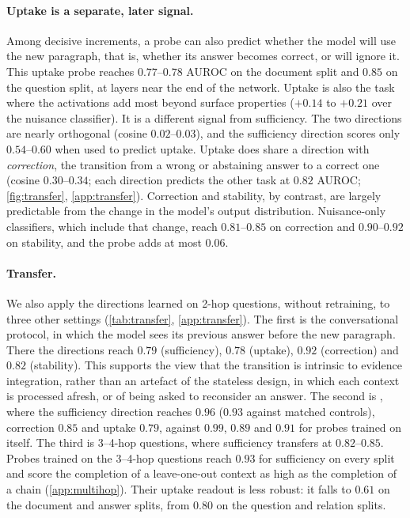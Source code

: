 \paragraph{Uptake is a separate, later signal.}
Among decisive increments, a probe can also predict whether the model will use the new paragraph, that is, whether its answer becomes correct, or will ignore it. This uptake probe reaches $0.77$--$0.78$ AUROC on the document split and $0.85$ on the question split, at layers near the end of the network. Uptake is also the task where the activations add most beyond surface properties ($+0.14$ to $+0.21$ over the nuisance classifier). It is a different signal from sufficiency. The two directions are nearly orthogonal (cosine $0.02$--$0.03$), and the sufficiency direction scores only $0.54$--$0.60$ when used to predict uptake. Uptake does share a direction with \emph{correction}, the transition from a wrong or abstaining answer to a correct one (cosine $0.30$--$0.34$; each direction predicts the other task at $0.82$ AUROC; \cref{fig:transfer}, \cref{app:transfer}). Correction and stability, by contrast, are largely predictable from the change in the model's output distribution. Nuisance-only classifiers, which include that change, reach $0.81$--$0.85$ on correction and $0.90$--$0.92$ on stability, and the probe adds at most $0.06$.

\paragraph{Transfer.}
We also apply the directions learned on 2-hop \musique{} questions, without retraining, to three other settings (\cref{tab:transfer}, \cref{app:transfer}). The first is the conversational protocol, in which the model sees its previous answer before the new paragraph. There the directions reach $0.79$ (sufficiency), $0.78$ (uptake), $0.92$ (correction) and $0.82$ (stability). This supports the view that the transition is intrinsic to evidence integration, rather than an artefact of the stateless design, in which each context is processed afresh, or of being asked to reconsider an answer. The second is \twowiki{}, where the sufficiency direction reaches $0.96$ ($0.93$ against matched controls), correction $0.85$ and uptake $0.79$, against $0.99$, $0.89$ and $0.91$ for probes trained on \twowiki{} itself. The third is 3--4-hop \musique{} questions, where sufficiency transfers at $0.82$--$0.85$. Probes trained on the 3--4-hop questions reach $0.93$ for sufficiency on every split and score the completion of a leave-one-out context as high as the completion of a chain (\cref{app:multihop}). Their uptake readout is less robust: it falls to $0.61$ on the document and answer splits, from $0.80$ on the question and relation splits.

